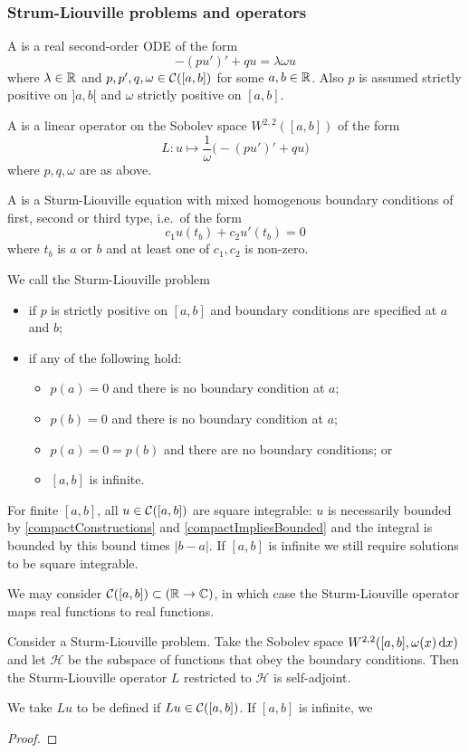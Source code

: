 \subsubsection{Strum-Liouville problems and operators}
\begin{definition}
A  is a real second-order ODE of the form
\[ -(pu')' + qu = \lambda \omega u \]
where $\lambda\in\mathbb{R}$ and $p,p',q,\omega\in \operatorname{\mathcal{C}}([a,b])$ for some $a,b\in \mathbb{R}$. Also $p$ is assumed strictly positive on $]a,b[$ and $\omega$ strictly positive on $[a,b]$.

A  is a linear operator on the Sobolev space $W^{2,2}([a,b])$ of the form
\[ L: u\mapsto \frac{1}{\omega}\Big(-(pu')' + qu\Big) \]
where $p,q, \omega$ are as above.

A  is a Sturm-Liouville equation with mixed homogenous boundary conditions of first, second or third type, i.e.\ of the form
\[ c_1 u(t_b) + c_2 u'(t_b) = 0 \]
where $t_b$ is $a$ or $b$ and at least one of $c_1,c_2$ is non-zero.

We call the Sturm-Liouville problem
\begin{itemize}
\item {} if $p$ is strictly positive on $[a,b]$ and boundary conditions are specified at $a$ and $b$;
\item {} if any of the following hold:
\begin{itemize}
\item $p(a) = 0$ and there is no boundary condition at $a$;
\item $p(b) = 0$ and there is no boundary condition at $a$;
\item $p(a) = 0 = p(b)$ and there are no boundary conditions; or
\item $[a,b]$ is infinite.
\end{itemize}
\end{itemize}
\end{definition}
For finite $[a,b]$, all $u\in\operatorname{\mathcal{C}}([a,b])$ are square integrable: $u$ is necessarily bounded by \ref{compactConstructions} and \ref{compactImpliesBounded} and the integral is bounded by this bound times $|b-a|$. If $[a,b]$ is infinite we still require solutions to be square integrable.

We may consider $\operatorname{\mathcal{C}}([a,b]) \subset (\mathbb{R}\to\mathbb{C})$, in which case the Sturm-Liouville operator maps real functions to real functions.

\begin{proposition}
Consider a Sturm-Liouville problem. Take the Sobolev space $W^{2,2}([a,b], \omega(x)\operatorname{d \!}{x})$ and let $\mathcal{H}$ be the subspace of functions that obey the boundary conditions. Then the Sturm-Liouville operator $L$ restricted to $\mathcal{H}$ is self-adjoint.
\end{proposition}
We take $Lu$ to be defined if $Lu\in\operatorname{\mathcal{C}}([a,b])$. If $[a,b]$ is infinite, we 
\begin{proof}

\end{proof}

